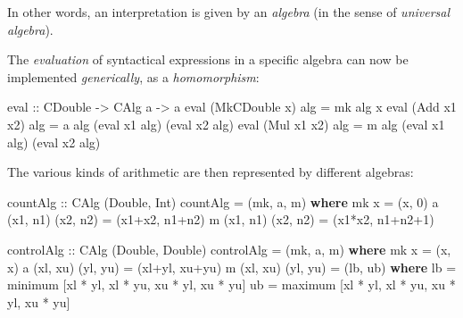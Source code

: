 \documentclass[]{article}
\newenvironment{Shaded}{}{}
\newcommand{\KeywordTok}[1]{\textcolor[rgb]{0.00,0.44,0.13}{\textbf{{#1}}}}
\newcommand{\DataTypeTok}[1]{\textcolor[rgb]{0.56,0.13,0.00}{{#1}}}
\newcommand{\DecValTok}[1]{\textcolor[rgb]{0.25,0.63,0.44}{{#1}}}
\newcommand{\OtherTok}[1]{\textcolor[rgb]{0.00,0.44,0.13}{{#1}}}
\newcommand{\FunctionTok}[1]{\textcolor[rgb]{0.02,0.16,0.49}{{#1}}}
\newcommand{\NormalTok}[1]{{#1}}
\begin{document}
In other words, an interpretation is given by an \emph{algebra} (in the
sense of \emph{universal algebra}).

The \emph{evaluation} of syntactical expressions in a specific algebra
can now be implemented \emph{generically}, as a \emph{homomorphism}:

\begin{Shaded}
\begin{Highlighting}[]
eval \OtherTok{::} \DataTypeTok{CDouble} \OtherTok{->}  \DataTypeTok{CAlg} \NormalTok{a  }\OtherTok{->} \NormalTok{a}
\NormalTok{eval (}\DataTypeTok{MkCDouble} \NormalTok{x)  alg     }\FunctionTok{=}  \NormalTok{mk alg x}
\NormalTok{eval (}\DataTypeTok{Add} \NormalTok{x1 x2)    alg     }\FunctionTok{=}  \NormalTok{a alg (eval x1 alg) (eval x2 alg)}
\NormalTok{eval (}\DataTypeTok{Mul} \NormalTok{x1 x2)    alg     }\FunctionTok{=}  \NormalTok{m alg (eval x1 alg) (eval x2 alg)}
\end{Highlighting}
\end{Shaded}

The various kinds of arithmetic are then represented by different
algebras:

\begin{Shaded}
\begin{Highlighting}[]
countAlg  \OtherTok{::}  \DataTypeTok{CAlg} \NormalTok{(}\DataTypeTok{Double}\NormalTok{, }\DataTypeTok{Int}\NormalTok{)}
\NormalTok{countAlg   }\FunctionTok{=}  \NormalTok{(mk, a, m) }\KeywordTok{where}
  \NormalTok{mk x                 }\FunctionTok{=}  \NormalTok{(x, }\DecValTok{0}\NormalTok{)}
  \NormalTok{a (x1, n1) (x2, n2)  }\FunctionTok{=}  \NormalTok{(x1}\FunctionTok{+}\NormalTok{x2, n1}\FunctionTok{+}\NormalTok{n2)}
  \NormalTok{m (x1, n1) (x2, n2)  }\FunctionTok{=}  \NormalTok{(x1}\FunctionTok{*}\NormalTok{x2, n1}\FunctionTok{+}\NormalTok{n2}\FunctionTok{+}\DecValTok{1}\NormalTok{)}

controlAlg  \OtherTok{::}  \DataTypeTok{CAlg} \NormalTok{(}\DataTypeTok{Double}\NormalTok{, }\DataTypeTok{Double}\NormalTok{)}
\NormalTok{controlAlg   }\FunctionTok{=}  \NormalTok{(mk, a, m) }\KeywordTok{where}
  \NormalTok{mk x                 }\FunctionTok{=}  \NormalTok{(x, x)}
  \NormalTok{a (xl, xu) (yl, yu)  }\FunctionTok{=}  \NormalTok{(xl}\FunctionTok{+}\NormalTok{yl, xu}\FunctionTok{+}\NormalTok{yu)}
  \NormalTok{m (xl, xu) (yl, yu)  }\FunctionTok{=}  \NormalTok{(lb, ub)}
    \KeywordTok{where}
    \NormalTok{lb  }\FunctionTok{=}  \NormalTok{minimum [xl }\FunctionTok{*} \NormalTok{yl, xl }\FunctionTok{*} \NormalTok{yu, xu }\FunctionTok{*} \NormalTok{yl, xu }\FunctionTok{*} \NormalTok{yu]}
    \NormalTok{ub  }\FunctionTok{=}  \NormalTok{maximum [xl }\FunctionTok{*} \NormalTok{yl, xl }\FunctionTok{*} \NormalTok{yu, xu }\FunctionTok{*} \NormalTok{yl, xu }\FunctionTok{*} \NormalTok{yu]}
\end{Highlighting}
\end{Shaded}
\end{document}
